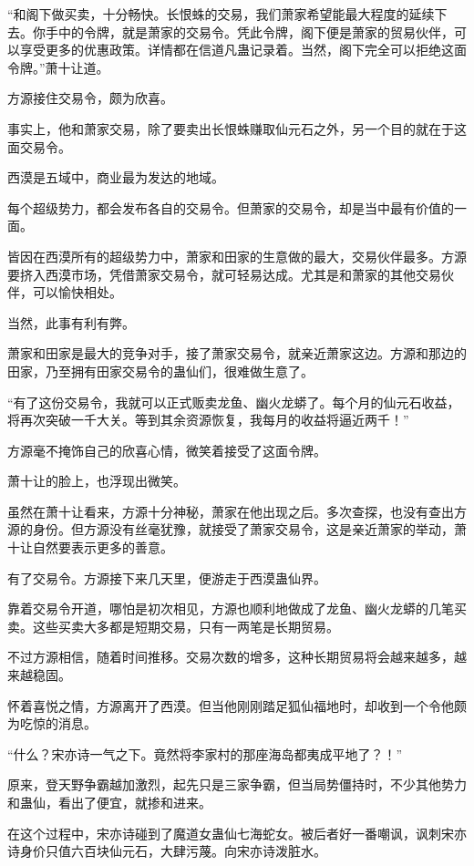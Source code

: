 
\begin{this_body}

“和阁下做买卖，十分畅快。长恨蛛的交易，我们萧家希望能最大程度的延续下去。你手中的令牌，就是萧家的交易令。凭此令牌，阁下便是萧家的贸易伙伴，可以享受更多的优惠政策。详情都在信道凡蛊记录着。当然，阁下完全可以拒绝这面令牌。”萧十让道。

方源接住交易令，颇为欣喜。

事实上，他和萧家交易，除了要卖出长恨蛛赚取仙元石之外，另一个目的就在于这面交易令。

西漠是五域中，商业最为发达的地域。

每个超级势力，都会发布各自的交易令。但萧家的交易令，却是当中最有价值的一面。

皆因在西漠所有的超级势力中，萧家和田家的生意做的最大，交易伙伴最多。方源要挤入西漠市场，凭借萧家交易令，就可轻易达成。尤其是和萧家的其他交易伙伴，可以愉快相处。

当然，此事有利有弊。

萧家和田家是最大的竞争对手，接了萧家交易令，就亲近萧家这边。方源和那边的田家，乃至拥有田家交易令的蛊仙们，很难做生意了。

“有了这份交易令，我就可以正式贩卖龙鱼、幽火龙蟒了。每个月的仙元石收益，将再次突破一千大关。等到其余资源恢复，我每月的收益将逼近两千！”

方源毫不掩饰自己的欣喜心情，微笑着接受了这面令牌。

萧十让的脸上，也浮现出微笑。

虽然在萧十让看来，方源十分神秘，萧家在他出现之后。多次查探，也没有查出方源的身份。但方源没有丝毫犹豫，就接受了萧家交易令，这是亲近萧家的举动，萧十让自然要表示更多的善意。

有了交易令。方源接下来几天里，便游走于西漠蛊仙界。

靠着交易令开道，哪怕是初次相见，方源也顺利地做成了龙鱼、幽火龙蟒的几笔买卖。这些买卖大多都是短期交易，只有一两笔是长期贸易。

不过方源相信，随着时间推移。交易次数的增多，这种长期贸易将会越来越多，越来越稳固。

怀着喜悦之情，方源离开了西漠。但当他刚刚踏足狐仙福地时，却收到一个令他颇为吃惊的消息。

“什么？宋亦诗一气之下。竟然将李家村的那座海岛都夷成平地了？！”

原来，登天野争霸越加激烈，起先只是三家争霸，但当局势僵持时，不少其他势力和蛊仙，看出了便宜，就掺和进来。

在这个过程中，宋亦诗碰到了魔道女蛊仙七海蛇女。被后者好一番嘲讽，讽刺宋亦诗身价只值六百块仙元石，大肆污蔑。向宋亦诗泼脏水。


\end{this_body}
